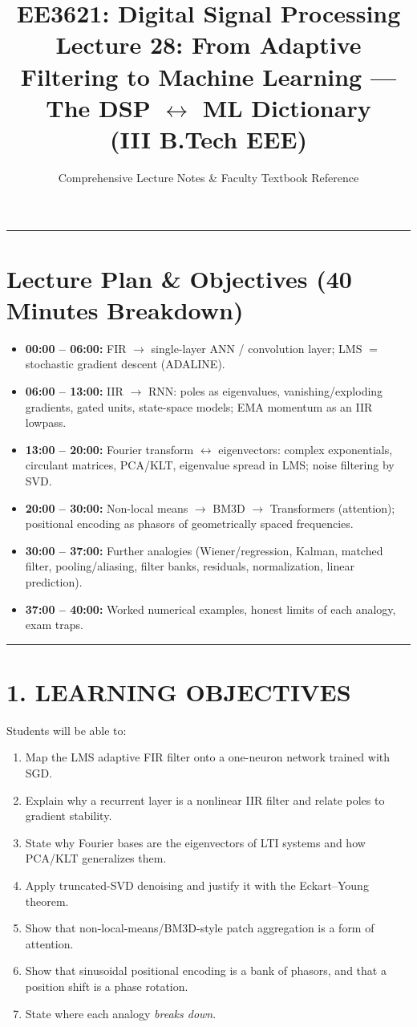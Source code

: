 \documentclass[11pt,a4paper]{article}
\title{\textbf{EE3621: Digital Signal Processing} \\ \Large Lecture 28: From Adaptive Filtering to Machine Learning --- The DSP $\leftrightarrow$ ML Dictionary \\ \large (III B.Tech EEE)}
\author{Comprehensive Lecture Notes \& Faculty Textbook Reference}
\date{}
\begin{document}
\maketitle

\noindent\rule{\textwidth}{0.5pt}

\section*{Lecture Plan \& Objectives (40 Minutes Breakdown)}
\begin{itemize}
    \item \textbf{00:00 -- 06:00:} FIR $\to$ single-layer ANN / convolution layer; LMS $=$ stochastic gradient descent (ADALINE).
    \item \textbf{06:00 -- 13:00:} IIR $\to$ RNN: poles as eigenvalues, vanishing/exploding gradients, gated units, state-space models; EMA momentum as an IIR lowpass.
    \item \textbf{13:00 -- 20:00:} Fourier transform $\leftrightarrow$ eigenvectors: complex exponentials, circulant matrices, PCA/KLT, eigenvalue spread in LMS; noise filtering by SVD.
    \item \textbf{20:00 -- 30:00:} Non-local means $\to$ BM3D $\to$ Transformers (attention); positional encoding as phasors of geometrically spaced frequencies.
    \item \textbf{30:00 -- 37:00:} Further analogies (Wiener/regression, Kalman, matched filter, pooling/aliasing, filter banks, residuals, normalization, linear prediction).
    \item \textbf{37:00 -- 40:00:} Worked numerical examples, honest limits of each analogy, exam traps.
\end{itemize}

\noindent\rule{\textwidth}{0.5pt}

\section{1. LEARNING OBJECTIVES}
Students will be able to:
\begin{enumerate}
    \item Map the LMS adaptive FIR filter onto a one-neuron network trained with SGD.
    \item Explain why a recurrent layer is a nonlinear IIR filter and relate poles to gradient stability.
    \item State why Fourier bases are the eigenvectors of LTI systems and how PCA/KLT generalizes them.
    \item Apply truncated-SVD denoising and justify it with the Eckart--Young theorem.
    \item Show that non-local-means/BM3D-style patch aggregation is a form of attention.
    \item Show that sinusoidal positional encoding is a bank of phasors, and that a position shift is a phase rotation.
    \item State where each analogy \emph{breaks down}.
\end{enumerate}
\end{document}
